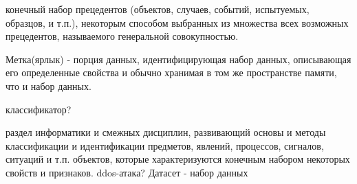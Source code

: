 \Defines %
\begin{description}
	
	\item[Выборка/выборка данных]  конечный набор прецедентов (объектов, случаев, событий, испытуемых, образцов, и т.п.), некоторым способом выбранных из множества всех возможных прецедентов, называемого генеральной совокупностью\cite{def01}.
	\item Метка(ярлык)  - порция данных, идентифицирующая набор данных, описывающая его определенные свойства и обычно хранимая в том же пространстве памяти, что и набор данных\cite{def02}.
	
	классификатор?
	\item[Теория распознавания образа] раздел информатики и смежных дисциплин, развивающий основы и методы классификации и идентификации предметов, явлений, процессов, сигналов, ситуаций и т.п. объектов, которые характеризуются конечным набором некоторых свойств и признаков.
	ddos-атака?
	Датасет - набор данных\cite{def03}
	
\end{description}


